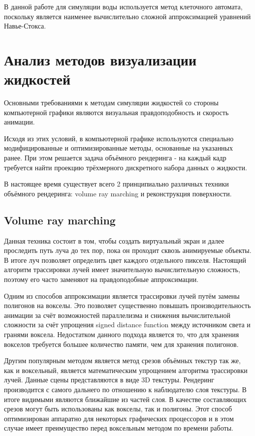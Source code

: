 В данной работе для симуляции воды используется метод клеточного автомата, поскольку
является наименее вычислительно сложной аппроксимацией уравнений Навье-Стокса\cite{conference:cellauto}.

\section{Анализ методов визуализации жидкостей}

Основными требованиями к методам симуляции жидкостей со стороны компьютерной графики
являются визуальная правдоподобность и скорость анимации.

Исходя из этих условий, в компьютерной графике используются специально модифицированные
и оптимизированные методы, основанные на указанных ранее. При этом решается задача объёмного
рендеринга - на каждый кадр требуется найти проекцию трёхмерного дискретного набора данных
о жидкости\cite{article:fastvolume}.

В настоящее время существует всего 2 принципиально различных техники объёмного рендеринга:
volume ray marching и реконструкция поверхности\cite{book:ash}.

\subsection{Volume ray marching}

Данная техника состоит в том, чтобы создать виртуальный экран и далее проследить
путь луча до тех пор, пока он проходит сквозь анимируемые объекты. В итоге луч
позволяет определить цвет каждого отдельного пикселя. Настоящий алгоритм трассировки лучей
имеет значительную вычислительную сложность, поэтому его часто заменяют на
правдоподобные аппроксимации\cite{book:ash}.

Одним из способов аппроксимации является трассировки лучей путём
замены полигонов на вокселы. Это позволяет существенно повышать производительность
анимации за счёт возможностей параллелизма и снижения вычислительной сложности за счёт упрощения
signed distance function между источником света и гранями воксела\cite{book:ash}.
Недостатком данного подхода является то, что для хранения вокселов требуется большее количество
памяти, чем для хранения полигонов.

Другим популярным методом является метод срезов объёмных текстур так же, как и воксельный, является математическим упрощением алгоритма трассировки лучей\cite{site:raymarching}.
Данные сцены представляются в виде 3D текстуры. Рендеринг производится с самого дальнего
 по отношению к наблюдателю слоя текстуры. В итоге видимыми являются ближайшие из частей
 слоя.
 В качестве составляющих срезов могут быть использованы как вокселы, так и полигоны.
 Этот способ оптимизирован аппаратно для некоторых графических процессоров
 и в этом случае имеет преимущество перед воксельным методом по времени работы.

